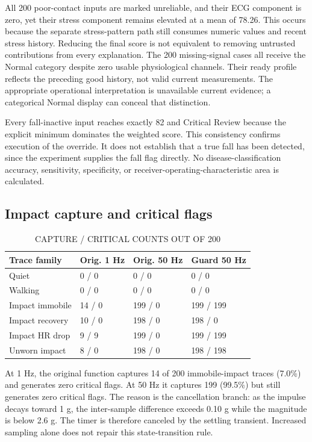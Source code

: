 \documentclass[journal]{IEEEtran}
\begin{document}
All 200 poor-contact inputs are marked unreliable, and their ECG component is zero, yet their stress component remains elevated at a mean of 78.26. This occurs because the separate stress-pattern path still consumes numeric values and recent stress history. Reducing the final score is not equivalent to removing untrusted contributions from every explanation. The 200 missing-signal cases all receive the Normal category despite zero usable physiological channels. Their ready profile reflects the preceding good history, not valid current measurements. The appropriate operational interpretation is unavailable current evidence; a categorical Normal display can conceal that distinction.

Every fall-inactive input reaches exactly 82 and Critical Review because the explicit minimum dominates the weighted score. This consistency confirms execution of the override. It does not establish that a true fall has been detected, since the experiment supplies the fall flag directly. No disease-classification accuracy, sensitivity, specificity, or receiver-operating-characteristic area is calculated.

\subsection{Impact capture and critical flags}
\begin{table}[!t]\caption{CAPTURE / CRITICAL COUNTS OUT OF 200}\centering\scriptsize\setlength{\tabcolsep}{2pt}
\begin{tabular}{p{}p{}p{}p{}}\hline
Trace family & Orig. 1 Hz & Orig. 50 Hz & Guard 50 Hz\\\hline
Quiet & 0 / 0 & 0 / 0 & 0 / 0\\
Walking & 0 / 0 & 0 / 0 & 0 / 0\\
Impact immobile & 14 / 0 & 199 / 0 & 199 / 199\\
Impact recovery & 10 / 0 & 198 / 0 & 198 / 0\\
Impact HR drop & 9 / 9 & 199 / 0 & 199 / 199\\
Unworn impact & 8 / 0 & 198 / 0 & 198 / 198\\
\hline\end{tabular}\end{table}
At 1 Hz, the original function captures 14 of 200 immobile-impact traces (7.0\%) and generates zero critical flags. At 50 Hz it captures 199 (99.5\%) but still generates zero critical flags. The reason is the cancellation branch: as the impulse decays toward 1 g, the inter-sample difference exceeds 0.10 g while the magnitude is below 2.6 g. The timer is therefore canceled by the settling transient. Increased sampling alone does not repair this state-transition rule.
\end{document}
